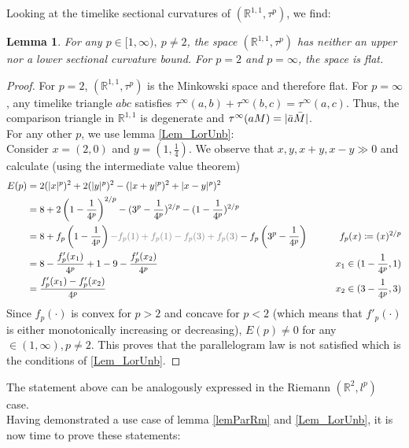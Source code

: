 \documentclass[11pt, a4paper]{article} %
\newcommand{\R}{\mathbb{R}} %
\newtheorem{lemma}[definition]{Lemma}
\theoremstyle{plain} %
\newcommand{\mDef}{\coloneqq }
\begin{document}
Looking at the timelike sectional curvatures of $(\R^{1,1},\tau^p)$, we find:
\begin{lemma}
For any $p \in [1,\infty),\ p\neq 2$, the space $(\R^{1,1},\tau^p)$ has neither an upper nor a lower sectional curvature bound. For $p=2$ and $p=\infty$, the space is flat.
\end{lemma}
\begin{proof}
For $p=2$, $(\R^{1,1},\tau^p)$ is the Minkowski space and therefore flat.
For $p=\infty$, any timelike triangle $abc$ satisfies $\tau^\infty(a,b) + \tau^\infty(b,c) = \tau^\infty(a,c)$. Thus, the comparison triangle in $\R^{1,1}$ is degenerate and $\tau^\infty(aM) = |\Bar{a}\Bar{M}|$.\\
   For any other $p$, we use lemma \ref{Lem_LorUnb}:\\
   Consider $x=(2,0)$ and $y = (1,\frac{1}{4})$.
   We observe that $x,y,x+y,x-y\gg0$ and calculate (using the intermediate value theorem) 
   \begin{align*}
      E(p) &= 2 (|x|^p)^2 + 2 (|y|^p)^2 -  (|x+y|^p)^2 + |x-y|^p)^2\\
      &= 8 + 2 \left(1 - \frac{1}{4^p}\right)^{2/p} -  (3^p - \frac{1}{4^p})^{2/p} -  (1 - \frac{1}{4^p})^{2/p}\\
       &= 8 + f_p\left(1 - \frac{1}{4^p}\right) \textcolor{gray}{-f_p(1) + f_p(1) -f_p(3) + f_p(3)} -  f_p\left(3^p - \frac{1}{4^p}\right)   &\null \qquad f_p(x)\mDef(x)^{2/p} \\
      &= 8 - \frac{f_p'(x_1)}{4^p} + 1 - 9 - \frac{f_p'(x_2)}{4^p}  &\null \qquad x_1\in (1-\frac{1}{4^p},1)\\
      &= \frac{f_p'(x_1) - f_p'(x_2)}{4^p} &\null \qquad x_2\in (3-\frac{1}{4^p},3)
   \end{align*}
   Since $f_p(\cdot)$ is convex for $p>2$ and concave for $p<2$ (which means that $f'_p(\cdot)$ is either monotonically increasing or decreasing), $E(p)\neq0$ for any $\in (1,\infty), p\neq 2$. This proves that the parallelogram law is not satisfied which is the conditions of \ref{Lem_LorUnb}.
\end{proof}
The statement above can be analogously expressed in the Riemann $(\R^2,l^p)$ case.\\
Having demonstrated a use case of lemma \ref{lemParRm} and \ref{Lem_LorUnb}, it is now time to prove these statements:
\end{document}
